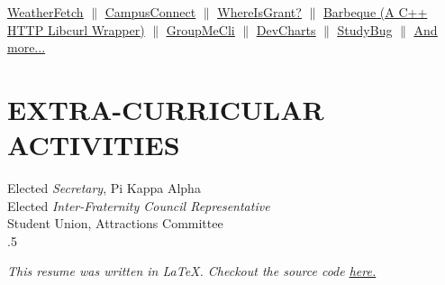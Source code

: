 \documentclass[margin=0.5in, 10pt]{res} %
\begin{document}
\begin{resume}
\underline{\color{blue}\href{http://www.weatherfetch.com}{WeatherFetch}} $\parallel$ \underline{\color{blue}\href{http://campusconnect.herokuapp.com}{CampusConnect}} $\parallel$
\underline{\color{blue}\href{http://whereisgrant.herokuapp.com}{WhereIsGrant?}} $\parallel$
\href{https://github.com/g12mcgov/Barbeque}{\underline {\color{blue} Barbeque} (A C++ HTTP Libcurl Wrapper)} $\parallel$
\underline{\color{blue}\href{https://github.com/g12mcgov/GroupMeCli}{GroupMeCli}} $\parallel$
\underline{\color{blue}\href{https://github.com/g12mcgov/DevCharts}{DevCharts}} $\parallel$
\underline{\color{blue}\href{https://github.com/g12mcgov/StudyBug}{StudyBug}} $\parallel$ \underline{\color{blue}\href{https://github.com/g12mcgov}{And more...}}




\section{EXTRA-CURRICULAR ACTIVITIES} 

Elected {\it Secretary}, Pi Kappa Alpha \\
Elected {\it Inter-Fraternity Council Representative} \\
Student Union, Attractions Committee \\


\moveleft.5\hoffset\centerline{{\small\sl This resume was written in \LaTeX. Checkout the source code \color{blue}\underline{\href{https://github.com/g12mcgov/resume}{here}.}}}


\end{resume}
\end{document}
